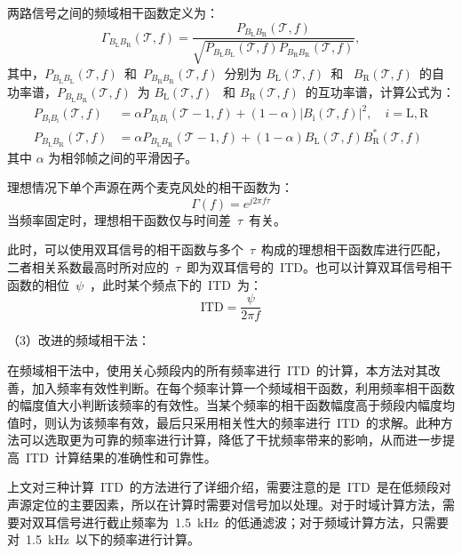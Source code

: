 两路信号之间的频域相干函数定义为：
\begin{equation}
\Gamma_{B_{\text{L}} B_{\text{R}}}(\mathscr{T},f)=\frac{P_{B_{\text{L}}B_{\text{R}}}(\mathscr{T}, f)}{\sqrt{P_{B_{\text{L}}B_{\text{L}}}(\mathscr{T}, f) P_{B_{\text{R}}B_{\text{R}}}(\mathscr{T},f)}},
\end{equation}
其中，$P_{B_{\text{L}}B_{\text{L}}}(\mathscr{T}, f)$~和~$P_{B_{\text{R}}B_{\text{R}}}(\mathscr{T},f)$~分别为 $B_{\text{L}}(\mathscr{T},f)$~和~
$B_{\text{R}}(\mathscr{T},f)$~的自功率谱，$P_{B_{\text{L}}B_{\text{R}}}(\mathscr{T},f)$~为 $B_{\text{L}}(\mathscr{T},f)$~
和 $B_{\text{R}}(\mathscr{T},f)$~的互功率谱，计算公式为：
\begin{align}
P_{B_{\text{i}}B_{\text{i}}}(\mathscr{T},f)
& =\alpha P_{B_{\text{i}}B_{\text{i}}}(\mathscr{T}-1,f)+
(1-\alpha)\left|B_{\text{i}}(\mathscr{T}, f)\right|^{2}, \quad i=\text{L},\text{R} \nonumber \\
P_{B_{\text{L}}B_{\text{R}}}(\mathscr{T},f) & =\alpha P_{B_{\text{L}}B_{\text{R}}}(\mathscr{T}-1,f)+
(1-\alpha) B_{\text{L}}(\mathscr{T},f) B_{\text{R}}^{*}(\mathscr{T},f)
\end{align}
其中 $\alpha$ 为相邻帧之间的平滑因子。

理想情况下单个声源在两个麦克风处的相干函数为：
\begin{equation}
\Gamma(f) = e^{j2\pi f\tau}
\end{equation}
当频率固定时，理想相干函数仅与时间差~$\tau$~有关。

此时，可以使用双耳信号的相干函数与多个~$\tau$~构成的理想相干函数库进行匹配，二者相关系数最高时所对应的~$\tau$~即为双耳信号的~ITD。也可以计算双耳信号相干函数的相位~$\psi$~，此时某个频点下的~ITD~为：
\begin{equation}
\text{ITD} = \frac{\psi}{2\pi f}
\end{equation}

\newpage
（3）改进的频域相干法：

在频域相干法中，使用关心频段内的所有频率进行~ITD~的计算，本方法对其改善，加入频率有效性判断。在每个频率计算一个频域相干函数，利用频率相干函数的幅度值大小判断该频率的有效性。当某个频率的相干函数幅度高于频段内幅度均值时，则认为该频率有效，最后只采用相关性大的频率进行~ITD~的求解。此种方法可以选取更为可靠的频率进行计算，降低了干扰频率带来的影响，从而进一步提高~ITD~计算结果的准确性和可靠性。

上文对三种计算~ITD~的方法进行了详细介绍，需要注意的是~ITD~是在低频段对声源定位的主要因素，所以在计算时需要对信号加以处理。对于时域计算方法，需要对双耳信号进行截止频率为~1.5~kHz~的低通滤波；对于频域计算方法，只需要对~1.5~kHz~以下的频率进行计算。

